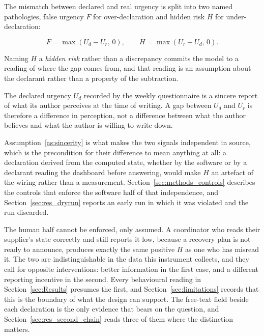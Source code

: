 The mismatch between declared and real urgency is split into two named pathologies, false
urgency $F$ for over-declaration and hidden risk $H$ for under-declaration:

\begin{equation}
    F = \max(U_d - U_r,\, 0), \qquad H = \max(U_r - U_d,\, 0).
    \label{eq:fh}
\end{equation}

Naming $H$ a \emph{hidden risk} rather than a discrepancy commits the model to a reading of
where the gap comes from, and that reading is an assumption about the declarant rather than a
property of the subtraction.

\begin{assumption}
\label{as:sincerity}
The declared urgency $U_d$ recorded by the weekly questionnaire is a sincere report of what
its author perceives at the time of writing. A gap between $U_d$ and $U_r$ is therefore a
difference in perception, not a difference between what the author believes and what the
author is willing to write down.
\end{assumption}

Assumption~\ref{as:sincerity} is what makes the two signals independent in source, which is
the precondition for their difference to mean anything at all: a declaration derived from the
computed state, whether by the software or by a declarant reading the dashboard before
answering, would make $H$ an artefact of the wiring rather than a measurement.
Section~\ref{sec:methods_controls} describes the controls that enforce the software half of
that independence, and Section~\ref{sec:res_dryrun} reports an early run in which it was
violated and the run discarded.

The human half cannot be enforced, only assumed. A coordinator who reads their supplier's
state correctly and still reports it low, because a recovery plan is not ready to announce,
produces exactly the same positive $H$ as one who has misread it. The two are
indistinguishable in the data this instrument collects, and they call for opposite
interventions: better information in the first case, and a different reporting incentive in
the second. Every behavioural reading in Section~\ref{sec:Results} presumes the first, and
Section~\ref{sec:limitations} records that this is the boundary of what the design can
support. The free-text field beside each declaration is the only evidence that bears on the
question, and Section~\ref{sec:res_second_chain} reads three of them where the distinction
matters.

